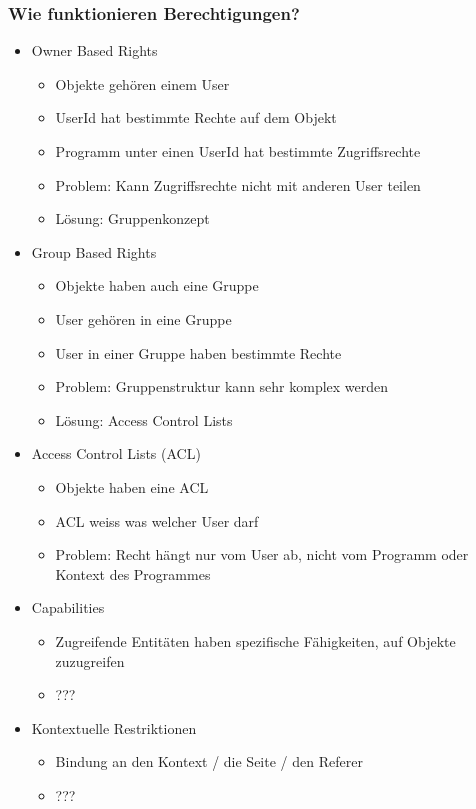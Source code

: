 \documentclass{article} %
\begin{document}
	\subsubsection{Wie funktionieren Berechtigungen?}
	\begin{itemize}
		\item Owner Based Rights
		\begin{itemize}
			\item Objekte gehören einem User
			\item UserId hat bestimmte Rechte auf dem Objekt
			\item Programm unter einen UserId hat bestimmte Zugriffsrechte
			\item Problem: Kann Zugriffsrechte nicht mit anderen User teilen
			\item Lösung: Gruppenkonzept
		\end{itemize}
		\item Group Based Rights
		\begin{itemize}
			\item Objekte haben auch eine Gruppe
			\item User gehören in eine Gruppe
			\item User in einer Gruppe haben bestimmte Rechte
			\item Problem: Gruppenstruktur kann sehr komplex werden
			\item Lösung: Access Control Lists
		\end{itemize}
		\item Access Control Lists (ACL)
		\begin{itemize}
			\item Objekte haben eine ACL
			\item ACL weiss was welcher User darf
			\item Problem: Recht hängt nur vom User ab, nicht vom Programm oder Kontext des Programmes	
		\end{itemize}
		\item Capabilities
		\begin{itemize}
			\item Zugreifende Entitäten haben spezifische Fähigkeiten, auf Objekte zuzugreifen
			\item ???
		\end{itemize}
		\item Kontextuelle Restriktionen
		\begin{itemize}
			\item Bindung an den Kontext / die Seite / den Referer
			\item ???
		\end{itemize}
	\end{itemize}
\end{document}
